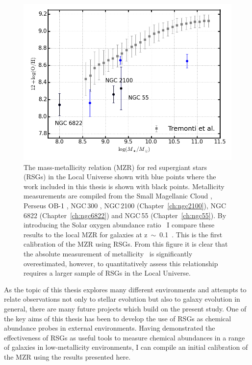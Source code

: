 \begin{figure}
 \centering
\includegraphics[width=\textwidth]{conclusions/MZR-RSGs}
\caption[Mass-metallicity relation from red supergiant stars]{
The mass-metallicity relation (MZR) for red supergiant stars (RSGs) in the Local Universe shown with blue points where the work included in this thesis is shown with black points.
Metallicity measurements are compiled from the Small Magellanic Cloud
\protect\citep{2015ApJ...806...21D}, Perseus OB-1
\protect\citep{2014ApJ...788...58G}, NGC\,300
\protect\citep{2015ApJ...805..182G},
NGC\,2100 (Chapter~\ref{ch:ngc2100}),
NGC\,6822 (Chapter~\ref{ch:ngc6822})
and NGC\,55 (Chapter~\ref{ch:ngc55}).
By introducing the Solar oxygen abundance ratio~\citep[12 + $\log$ (0/H)$_{\odot}$~=~8.69][]{2009ARA&A..47..481A} I compare these results to the local MZR for galaxies at z~$\sim$~0.1~\citep{Tremonti04}.
This is the first calibration of the MZR using RSGs.
From this figure it is clear that the absolute measurement of metallicity~\citep{Tremonti04} is significantly overestimated, however, to quantitatively assess this relationship requires a larger sample of RSGs in the Local Universe.
\label{fig:concMZR}
         }
\end{figure}

As the topic of this thesis explores many different environments and attempts to relate observations not only to stellar evolution but also to galaxy evolution in general, there are many future projects which build on the present study.
One of the key aims of this thesis has been to develop the use of RSGs as chemical abundance probes in external environments.
Having demonstrated the effectiveness of RSGs as useful tools to measure chemical abundances in a range of galaxies in low-metallicity environments, I can compile an initial calibration of the MZR using the results presented here.

